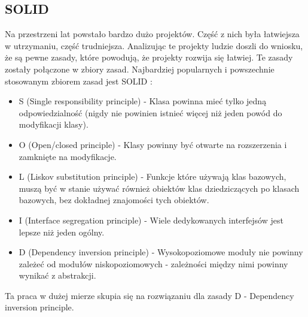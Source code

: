 \documentclass[12pt]{article}
\begin{document}
\subsection{SOLID}
Na przestrzeni lat powstało bardzo dużo projektów. Część z nich była łatwiejsza w utrzymaniu, część trudniejsza. Analizując te projekty ludzie doszli do wniosku, że są pewne zasady, które powodują, że projekty rozwija się łatwiej. Te zasady zostały połączone w zbiory zasad. Najbardziej popularnych i powszechnie stosowanym zbiorem zasad jest SOLID \cite{SOLID}:
\begin{itemize}
	\item S (Single responsibility principle) - Klasa powinna mieć tylko jedną odpowiedzialność (nigdy nie powinien istnieć więcej niż jeden powód do modyfikacji klasy).
	\item O (Open/closed principle) - Klasy powinny być otwarte na rozszerzenia i zamknięte na modyfikacje.
	\item L (Liskov substitution principle) - Funkcje które używają klas bazowych, muszą być w stanie używać również obiektów klas dziedziczących po klasach bazowych, bez dokładnej znajomości tych obiektów.
	\item I (Interface segregation principle) - Wiele dedykowanych interfejsów jest lepsze niż jeden ogólny.
	\item D (Dependency inversion principle) - Wysokopoziomowe moduły nie powinny zależeć od modułów niskopoziomowych - zależności między nimi powinny wynikać z abstrakcji.
\end{itemize}
Ta praca w dużej mierze skupia się na rozwiązaniu dla zasady D - Dependency inversion principle. 
\end{document}
